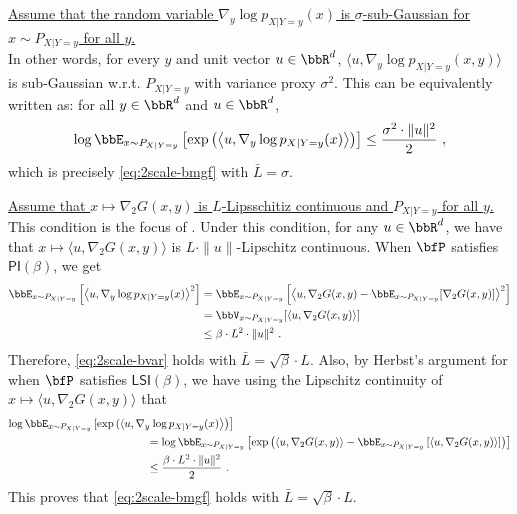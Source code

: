 \documentclass[11pt]{article}
\newcounter{ct}
\newcommand{\PI}[1]{\mathsf{PI}\left(#1\right)}
\newcommand{\LSI}[1]{\mathsf{LSI}\left(#1\right)}
\begin{document}
\begin{condlist}[leftmargin=*]
    \item \underline{Assume that the random variable \(\nabla_{y}\log p_{X | Y = y}(x)\) is \(\sigma\)-sub-Gaussian for \(x \!\sim P_{X | Y = y}\) for all \(y\).}\\
    In other words, for every \(y\) and unit vector \(u \in \bbR^{d}\), \(\langle u, \nabla_{y} \log p_{X | Y = y}(x, y)\rangle\) is sub-Gaussian w.r.t. \(P_{X | Y =y}\) with variance proxy \(\sigma^{2}\).
    This can be equivalently written as: for all \(y \in \bbR^{d}\) and \(u \in \bbR^{d}\),
    \begin{equation*}
        \log \bbE_{x \sim P_{X | Y = y}}\left[\exp\left(\left\langle u, \nabla_{y}\log p_{X | Y = y}(x)\right\rangle \right)\right] \leq \frac{\sigma^{2} \cdot \|u\|^{2}}{2}~,
    \end{equation*}
    which is precisely \ref{eq:2scale-bmgf} with \(\bar{L} = \sigma\).

    \item \label{cond:lips-cond} \underline{Assume that \(x \mapsto \nabla_{2}G(x, y)\) is \(L\)-Lipsschitiz continuous and \(P_{X | Y= y}\) for all \(y\).}\\
    This condition is the focus of \citet[Thm. 2, Lem. 7]{otto2007new}.
    Under this condition, for any \(u \in \bbR^{d}\), we have that \(x \mapsto \langle u, \nabla_{2}G(x, y)\rangle\) is \(L \cdot \|u\|\)-Lipschitz continuous.
    When \(\bfP\) satisfies \(\PI{\beta}\), we get
    \begin{align*}
        \bbE_{x \sim P_{X | Y = y}}\left[\left\langle u, \nabla_{y}\log p_{X | Y = y}(x)\right\rangle^{2}\right] &=
        \bbE_{x \sim P_{X | Y = y}}\left[\left\langle u, \nabla_{2}G(x, y) - \bbE_{x \sim P_{X | Y = y}}[\nabla_{2}G(x, y)]\right\rangle^{2}\right] \\
        &= \bbV_{x \sim P_{X | Y = y}}[\left\langle u, \nabla_{2}G(x, y)\right\rangle] \\
        &\leq \beta \cdot L^{2} \cdot \|u\|^{2}~.
    \end{align*}
    Therefore, \ref{eq:2scale-bvar} holds with \(\bar{L} = \sqrt{\beta} \cdot L\).
    Also, by Herbst's argument \citep[Prop. 5.41]{bakry2014analysis} for when \(\bfP\) satisfies \(\LSI{\beta}\), we have using the Lipschitz continuity of \(x \mapsto \langle u, \nabla_{2}G(x, y)\rangle\) that
    \begin{align*}
        \log \bbE_{x \sim P_{X | Y = y}}\left[\exp\left(\left\langle u, \nabla_{y}\right.\right.\right.\!\!\!\! &\left.\left.\left.\log p_{X | Y = y}(x)\right\rangle \right)\right] \\ 
        &= \log \bbE_{x \sim P_{X | Y= y}}\left[\exp\left(\langle u, \nabla_{2}G(x, y)\rangle - \bbE_{x \sim P_{X | Y =y}}\left[\langle u, \nabla_{2}G(x, y)\rangle\right]\right)\right] \\
        &\leq \frac{\beta \cdot L^{2} \cdot \|u\|^{2}}{2}~.
    \end{align*}
    This proves that \ref{eq:2scale-bmgf} holds with \(\bar{L} = \sqrt{\beta} \cdot L\).
\end{condlist}
\end{document}
